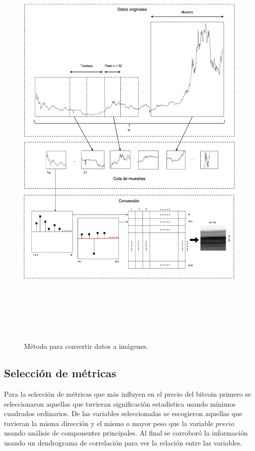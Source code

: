 \begin{figure}[h!]
	\includegraphics[width=\textwidth,height=21cm]{Chapter3/3-2.png}
	\caption{Método para convertir datos a imágenes.}
	\label{fig: met5}
\end{figure}

\subsection{Selección de métricas}
\label{ssec:metrics}
Para la selección de métricas que más influyen en el precio del bitcoin primero se seleccionaron aquellas que tuvieran significación estadística usando mínimos cuadrados ordinarios. De las variables seleccionadas se escogieron aquellas que tuvieran la misma dirección y el mismo o mayor peso que la variable $precio$ usando análisis de componentes principales. Al final se corroboró la información usando un dendrograma de correlación para ver la relación entre las variables.

